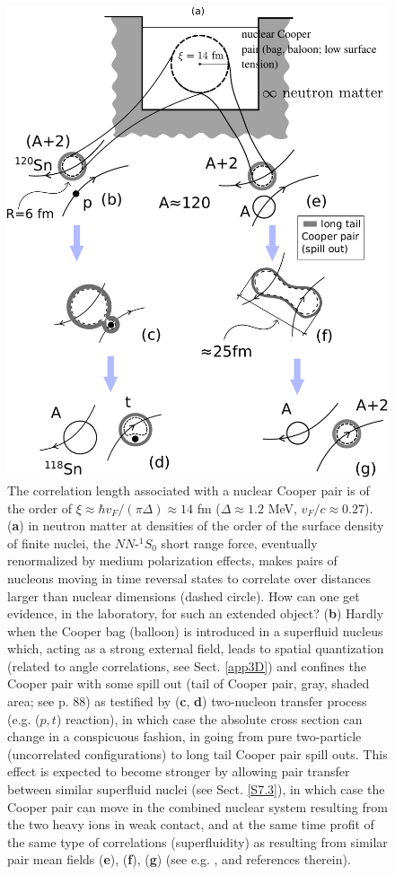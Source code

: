 \begin{figure}
	\centerline{\includegraphics*[width=12cm,angle=0]{nutshell/figs/fig_gamma.pdf}}
\caption{The correlation length associated with a nuclear Cooper pair is of the order of $\xi\approx \hbar v_F/(\pi\Delta)\approx 14 $ fm ($\Delta\approx1.2$ MeV, $v_F/c\approx0.27$).(\textbf{a}) in neutron matter at densities  of the order of the surface density of finite nuclei, the $NN$-$^{1}S_0$ short range force, eventually renormalized by medium polarization effects, makes pairs of nucleons moving in time reversal states to correlate over distances larger than nuclear dimensions (dashed circle). How can one get evidence, in the laboratory, for such an extended object? (\textbf{b}) Hardly when the Cooper bag (balloon) is introduced in  a superfluid nucleus  which, acting as a  strong external field, leads to spatial quantization (related to angle correlations, see Sect. \ref{app3D}) and confines the Cooper pair  with some spill out (tail of Cooper pair, gray, shaded area; see \cite{Bertsch:05} p. 88) as testified by (\textbf{c}, \textbf{d}) two-nucleon transfer process (e.g. ($p,t$) reaction), in which case the absolute cross section can change in a conspicuous fashion, in going from pure two-particle (uncorrelated configurations) to long tail Cooper pair spill outs. This effect is expected to become stronger by allowing pair transfer between similar superfluid nuclei (see Sect. \ref{S7.3}), in which case the Cooper pair can move in the combined nuclear system resulting from the two heavy ions in weak contact, and at the same time profit of the same type of correlations (superfluidity) as resulting from  similar pair mean fields (\textbf{e}), (\textbf{f}), (\textbf{g}) (see e.g. \cite{Oertzen:13,vonOertzen:01}, and references therein). 
}\label{fig_gamma}
\end{figure}
